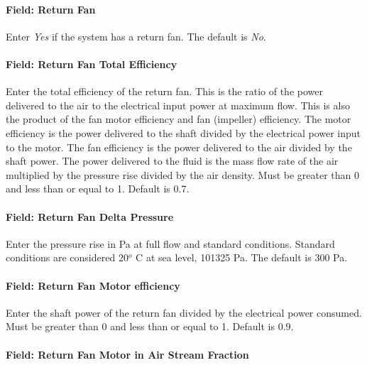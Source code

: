\paragraph{Field: Return Fan}\label{field-return-fan-3}

Enter \emph{Yes} if the system has a return fan. The default is \emph{No}.

\paragraph{Field: Return Fan Total Efficiency}\label{field-return-fan-total-efficiency-3}

Enter the total efficiency of the return fan. This is the ratio of the power delivered to the air to the electrical input power at maximum flow. This is also the product of the fan motor efficiency and fan (impeller) efficiency. The motor efficiency is the power delivered to the shaft divided by the electrical power input to the motor. The fan efficiency is the power delivered to the air divided by the shaft power. The power delivered to the fluid is the mass flow rate of the air multiplied by the pressure rise divided by the air density. Must be greater than 0 and less than or equal to 1. Default is 0.7.

\paragraph{Field: Return Fan Delta Pressure}\label{field-return-fan-delta-pressure-5}

Enter the pressure rise in Pa at full flow and standard conditions. Standard conditions are considered 20\(^{o}\) C at sea level, 101325 Pa. The default is 300 Pa.

\paragraph{Field: Return Fan Motor efficiency}\label{field-return-fan-motor-efficiency-5}

Enter the shaft power of the return fan divided by the electrical power consumed. Must be greater than 0 and less than or equal to 1. Default is 0.9.

\paragraph{Field: Return Fan Motor in Air Stream Fraction}\label{field-return-fan-motor-in-air-stream-fraction-5}

